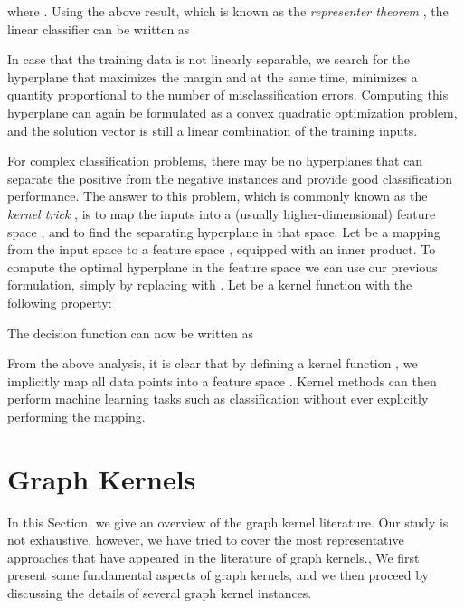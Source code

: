 \documentclass[twoside,11pt]{article}
\begin{document}
where .
Using the above result, which is known as the \textit{representer theorem} \cite{scholkopf2001generalized}, the linear classifier  can be written as

In case that the training data is not linearly separable, we search for the hyperplane that maximizes the margin and at the same time, minimizes a quantity proportional to the number of misclassification errors. 
Computing this hyperplane can again be formulated as a convex quadratic optimization problem, and the solution vector  is still a linear combination of the training inputs.

For complex classification problems, there may be no hyperplanes that can separate the positive from the negative instances and provide good classification performance.
The answer to this problem, which is commonly known as the \textit{kernel trick} \cite{aizerman1964theoretical,boser1992training}, is to map the inputs into a (usually higher-dimensional) feature space , and to find the separating hyperplane in that space.
Let  be a mapping from the input space  to a feature space , equipped with an inner product.
To compute the optimal hyperplane in the feature space we can use our previous formulation, simply by replacing  with .
Let  be a kernel function with the following property:

The decision function  can now be written as

From the above analysis, it is clear that by defining a kernel function , we implicitly map all data points into a feature space .
Kernel methods can then perform machine learning tasks such as classification without ever explicitly performing the mapping.



\section{Graph Kernels}\label{sec:graph_kernels}
In this Section, we give an overview of the graph kernel literature.
Our study is not exhaustive, however, we have tried to cover the most representative approaches that have appeared in the literature of graph kernels., 
We first present some fundamental aspects of graph kernels, and we then proceed by discussing the details of several graph kernel instances.
\end{document}
